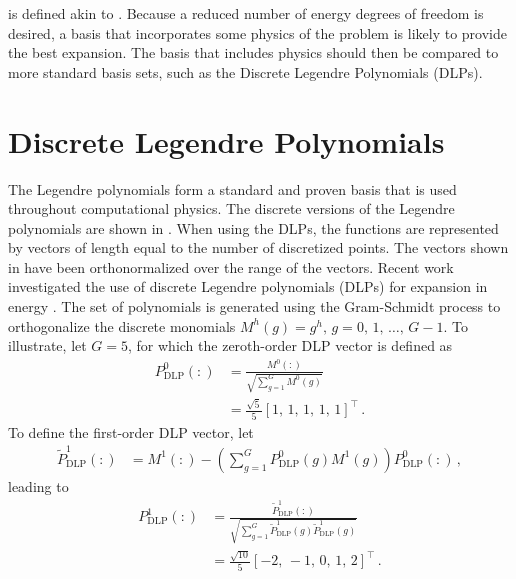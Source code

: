  is defined akin to 
. Because a 
reduced number of energy degrees of freedom is desired, a basis that 
incorporates some physics of the problem is likely to provide the best 
expansion.  The basis that includes physics should then be compared to more 
standard basis sets, such as the Discrete Legendre Polynomials (DLPs).


\section{Discrete Legendre Polynomials}

The Legendre polynomials form a standard and proven basis that is used 
throughout computational physics.  The discrete versions of the Legendre 
polynomials are shown in .  When using the DLPs, the 
functions are represented by vectors of length equal to the number of 
discretized points.  The vectors shown in  have been 
orthonormalized over the range of the vectors. Recent work 
investigated the use of discrete Legendre polynomials (DLPs) for expansion in 
energy \citep{Roberts2014, Zhu2010, Zhu2011}.  The set of polynomials is 
generated using the 
Gram-Schmidt process to orthogonalize the discrete monomials $M^h(g) =  g^h,\, 
g=0,\,1,\,\ldots,\, G-1$. To illustrate, let $G=5$, for which the zeroth-order 
DLP vector is defined as
\begin{equation}
    \begin{split}
        P_{\text{DLP}}^0(:) &= \frac{M^0(:)}{\sqrt{\sum_{g=1}^{G} M^0(g)}} \\
        &= \frac{\sqrt{5}}{5}[1,\,1,\,1,\,1,\,1]^{\intercal} \, .
    \end{split}
\end{equation}
To define the  first-order DLP vector, let
\begin{equation}
    \begin{split}
        \tilde{P}_{\text{DLP}}^1(:) &= M^1(:) - \left ( \sum_{g=1}^{G} 
        P_{\text{DLP}}^0(g) M^1(g) \right ) P_{\text{DLP}}^0(:)   \, ,
    \end{split}
\end{equation}
leading to
\begin{equation}
    \begin{split}
        P_{\text{DLP}}^1(:) &= 
        \frac{\tilde{P}_{\text{DLP}}^1(:)}{\sqrt{\sum_{g=1}^{G} 
                \tilde{P}_{\text{DLP}}^1(g)\tilde{P}_{\text{DLP}}^1(g)}} \\
        &= \frac{\sqrt{10}}{5} [-2,\,-1,\,0,\,1,\,2]^{\intercal} \, .
    \end{split}
\end{equation}

